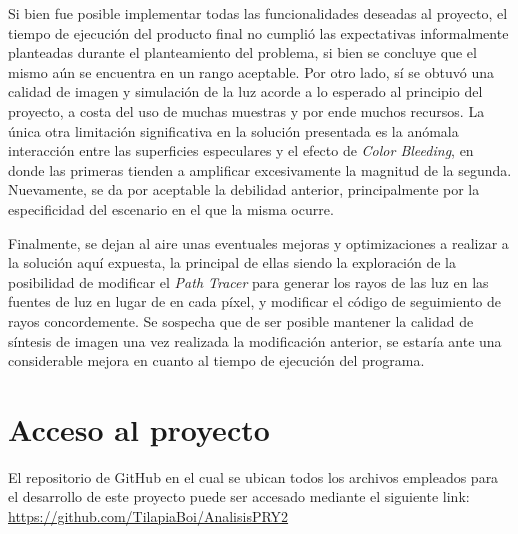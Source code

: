 \documentclass[conference]{IEEEtran}
\begin{document}
Si bien fue posible implementar todas las funcionalidades deseadas al proyecto, el tiempo de ejecución del producto final no cumplió las expectativas informalmente planteadas durante el planteamiento del problema, si bien se concluye que el mismo aún se encuentra en un rango aceptable. Por otro lado, sí se obtuvó una calidad de imagen y simulación de la luz acorde a lo esperado al principio del proyecto, a costa del uso de muchas muestras y por ende muchos recursos. La única otra limitación significativa en la solución presentada es la anómala interacción entre las superficies especulares y el efecto de \textit{Color Bleeding}, en donde las primeras tienden a amplificar excesivamente la magnitud de la segunda. Nuevamente, se da por aceptable la debilidad anterior, principalmente por la especificidad del escenario en el que la misma ocurre.

Finalmente, se dejan al aire unas eventuales mejoras y optimizaciones  a realizar a la solución aquí expuesta, la principal de ellas siendo la exploración de la posibilidad de modificar el \textit{Path Tracer} para generar los rayos de las luz en las fuentes de luz en lugar de en cada píxel, y modificar el código de seguimiento de rayos concordemente. Se sospecha que de ser posible mantener la calidad de síntesis de imagen una vez realizada la modificación anterior, se estaría ante una considerable mejora en cuanto al tiempo de ejecución del programa. 
\section{Acceso al proyecto}
El repositorio de GitHub en el cual se ubican todos los archivos empleados para el desarrollo de este proyecto puede ser accesado mediante el siguiente link: \url{https://github.com/TilapiaBoi/AnalisisPRY2}
\end{document}
